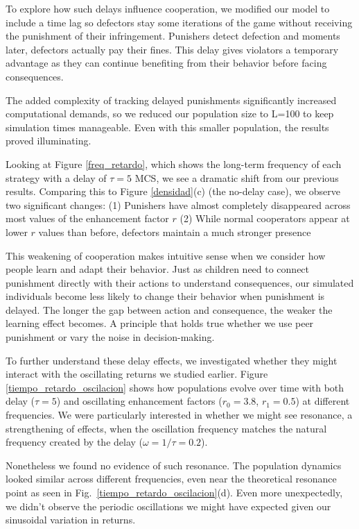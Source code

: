 To explore how such delays influence cooperation, we modified our model to include a time lag so defectors stay some iterations of the game without receiving the punishment of their infringement.  Punishers detect defection and moments later, defectors actually pay their fines. This delay gives violators a temporary advantage as they can continue benefiting from their behavior before facing consequences.

The added complexity of tracking delayed punishments significantly increased computational demands, so we reduced our population size to L=100 to keep simulation times manageable. Even with this smaller population, the results proved illuminating.

Looking at Figure \ref{freq_retardo}, which shows the long-term frequency of each strategy with a delay of $\tau=5$ MCS, we see a dramatic shift from our previous results. Comparing this to Figure \ref{densidad}(c) (the no-delay case), we observe two significant changes: (1) Punishers have almost completely disappeared across most values of the enhancement factor $r$ (2) While normal cooperators appear at lower $r$ values than before, defectors maintain a much stronger presence

This weakening of cooperation makes intuitive sense when we consider how people learn and adapt their behavior. Just as children need to connect punishment directly with their actions to understand consequences, our simulated individuals become less likely to change their behavior when punishment is delayed. The longer the gap between action and consequence, the weaker the learning effect becomes. A principle that holds true whether we use peer punishment or vary the noise in decision-making.

To further understand these delay effects, we investigated whether they might interact with the oscillating returns we studied earlier. Figure \ref{tiempo_retardo_oscilacion} shows how populations evolve over time with both delay ($\tau=5$) and oscillating enhancement factors ($r_0=3.8$, $r_1=0.5$) at different frequencies. We were particularly interested in whether we might see resonance, a strengthening of effects, when the oscillation frequency matches the natural frequency created by the delay ($\omega=1/\tau=0.2$).

Nonetheless we found no evidence of such resonance. The population dynamics looked similar across different frequencies, even near the theoretical resonance point as seen in Fig.~\ref{tiempo_retardo_oscilacion}(d). Even more unexpectedly, we didn't observe the periodic oscillations we might have expected given our sinusoidal variation in returns.

